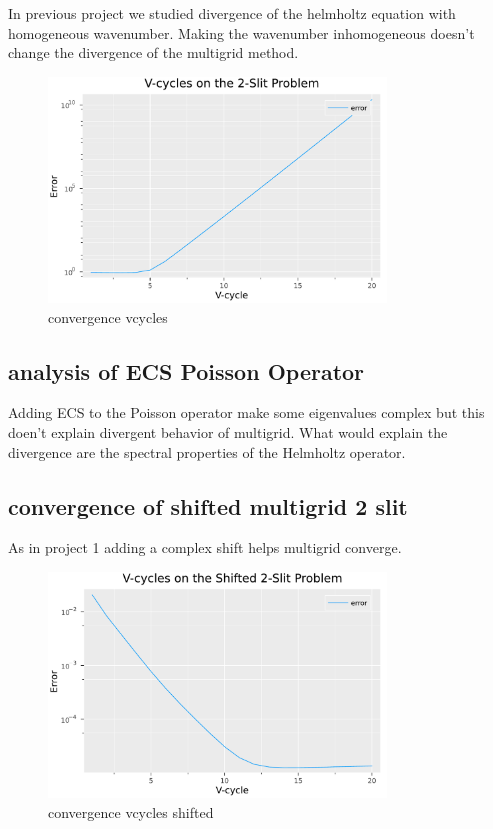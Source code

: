 \documentclass[a4paper,12pt]{article}
\begin{document}
In previous project we studied divergence of the helmholtz equation with homogeneous wavenumber.
Making the wavenumber inhomogeneous doesn't change the divergence of the multigrid method.

\begin{figure}[h!]
    \centering
    \includegraphics[width=0.8\textwidth]{../plots/Convergence_of_V-cycles_on_the_2-Slit_Problem.pdf}
    \caption{convergence vcycles}
    \label{fig:../plots/Convergence_of_V-cycles_on_the_2-Slit_Problem.pdf}
\end{figure}

\subsection{analysis of ECS Poisson Operator}
Adding ECS to the Poisson operator  make some eigenvalues complex but this doen't explain divergent behavior
of multigrid. What would explain the divergence are the spectral properties of the Helmholtz operator.

\subsection{convergence of shifted multigrid 2 slit}
As in project 1 adding a complex shift helps multigrid converge.
\begin{figure}[h!]
    \centering
    \includegraphics[width=0.8\textwidth]{../plots/Vcycles_shifted2slit.pdf}
    \caption{convergence vcycles shifted}
    \label{fig:../plots/Vcycles_shifted2slit.pdf}
\end{figure}
\end{document}
